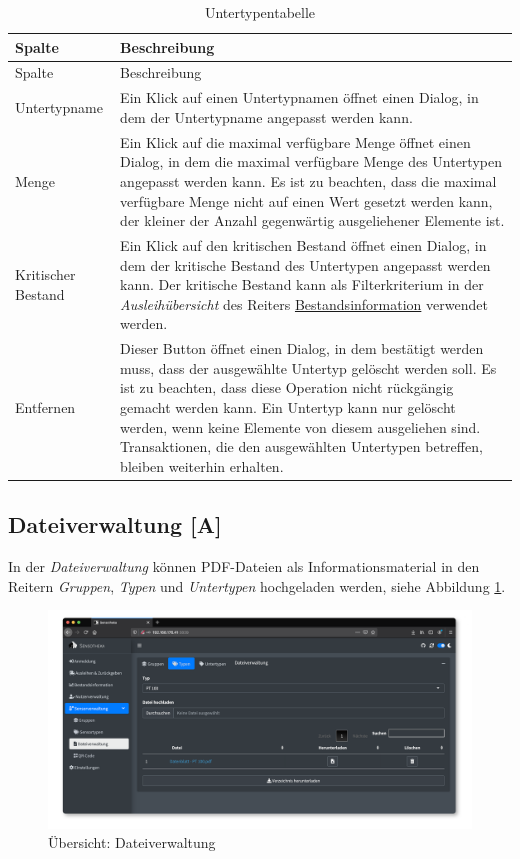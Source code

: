 \documentclass[
]{article}
\begin{document}
\begin{longtable}[]{@{}
  >{\raggedright\arraybackslash}p{}
  >{\raggedright\arraybackslash}p{}@{}}
\caption{\label{tab:subtype-table} Untertypentabelle}\tabularnewline
\toprule
Spalte & Beschreibung \\
\midrule
\endfirsthead
\toprule
Spalte & Beschreibung \\
\midrule
\endhead
Untertypname & Ein Klick auf einen Untertypnamen öffnet einen Dialog, in dem der Untertypname angepasst werden kann. \\
Menge & Ein Klick auf die maximal verfügbare Menge öffnet einen Dialog, in dem die maximal verfügbare Menge des Untertypen angepasst werden kann. Es ist zu beachten, dass die maximal verfügbare Menge nicht auf einen Wert gesetzt werden kann, der kleiner der Anzahl gegenwärtig ausgeliehener Elemente ist. \\
Kritischer Bestand & Ein Klick auf den kritischen Bestand öffnet einen Dialog, in dem der kritische Bestand des Untertypen angepasst werden kann. Der kritische Bestand kann als Filterkriterium in der \emph{Ausleihübersicht} des Reiters \protect\hyperlink{reporting}{Bestandsinformation} verwendet werden. \\
Entfernen & Dieser Button öffnet einen Dialog, in dem bestätigt werden muss, dass der ausgewählte Untertyp gelöscht werden soll. Es ist zu beachten, dass diese Operation nicht rückgängig gemacht werden kann. Ein Untertyp kann nur gelöscht werden, wenn keine Elemente von diesem ausgeliehen sind. Transaktionen, die den ausgewählten Untertypen betreffen, bleiben weiterhin erhalten. \\
\bottomrule
\end{longtable}

\hypertarget{file-management}{%
\subsection{Dateiverwaltung {[}A{]}}\label{file-management}}

In der \emph{Dateiverwaltung} können PDF-Dateien als Informationsmaterial in den Reitern \emph{Gruppen}, \emph{Typen} und \emph{Untertypen} hochgeladen werden, siehe Abbildung \ref{fig:file-management-overview}.

\begin{figure}
\centering
\includegraphics{./img/file_management_overview.png}
\caption{\label{fig:file-management-overview}Übersicht: Dateiverwaltung}
\end{figure}
\end{document}
